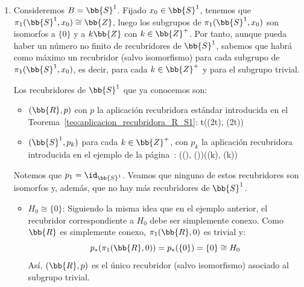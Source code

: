 \begin{ejemplo}
\begin{enumerate}
        Por ejemplo, llegados a este punto nos planteamos si $\bb{R}^n$ es un recubridor de $\bb{R}\bb{P}^n$. Tenemos que:
        \begin{itemize}
            \item $\bb{R}^n$ es simplemente conexo, luego no es homeomorfo a $\bb{R}\bb{P}^n$.
            \item $\bb{R}^n$ no es compacto, luego no es homeomorfo a $\bb{S}^n$.
        \end{itemize}

        Si $\bb{R}^n$ fuese un recubridor de $\bb{R}\bb{P}^n$, entonces sería isomorfo a uno de los dos recubridores que ya conocemos, y en particular sería homeomorfo a $\bb{S}^n$ o a $\bb{R}\bb{P}^n$, lo cual no es posible. Por tanto, $\bb{R}^n$ no es un recubridor de $\bb{R}\bb{P}^n$.

        \item Consideremos $B=\bb{S}^1$. Fijado $x_0\in \bb{S}^1$, tenemos que $\pi_1(\bb{S}^1, x_0) \cong \bb{Z}$, luego los subgrupos de $\pi_1(\bb{S}^1, x_0)$ son isomorfos a $\{0\}$ y a $k\bb{Z}$ con $k\in \bb{Z}^+$. Por tanto, aunque pueda haber un número no finito de recubridores de $\bb{S}^1$, sabemos que habrá como máximo un recubridor (salvo isomorfismo) para cada subgrupo de $\pi_1(\bb{S}^1, x_0)$, es decir, para cada $k\in \bb{Z}^+$ y para el subgrupo trivial.
        
        Los recubridores de $\bb{S}^1$ que ya conocemos son:
        \begin{itemize}
            \item $(\bb{R}, p)$ con $p$ la aplicación recubridora estándar introducida en el Teorema~\ref{teo:aplicacion_recubridora_R_S1}:
                {t}{(\cos(2\pi t), \sen(2\pi t))}
            \item $(\bb{S}^1, p_k)$ para cada $k\in \bb{Z}^+$, con $p_k$ la aplicación recubridora introducida en el ejemplo de la página~\pageref{ej:aplicacion_recubridora_no_homeomorfismo}:
                {(\cos(\theta), \sen(\theta))}{(\cos(k\theta), \sen(k\theta))}
        \end{itemize}

        Notemos que $p_1=\id_{\bb{S}^1}$. Veamos que ninguno de estos recubridores son isomorfos y, además, que no hay más recubridores de $\bb{S}^1$.
        \begin{itemize}
            \item \ul{$H_0 \cong \{0\}$}: Siguiendo la misma idea que en el ejemplo anterior, el recubridor correspondiente a $H_0$ debe ser simplemente conexo. Como $\bb{R}$ es simplemente conexo, $\pi_1(\bb{R}, 0)$ es trivial y:
            \begin{equation*}
                p_\ast(\pi_1(\bb{R}, 0)) = p_\ast(\{0\}) = \{0\} \cong H_0
            \end{equation*}
            Así, $(\bb{R}, p)$ es el único recubridor (salvo isomorfismo) asociado al subgrupo trivial.


\end{itemize}
\end{enumerate}
\end{ejemplo}
